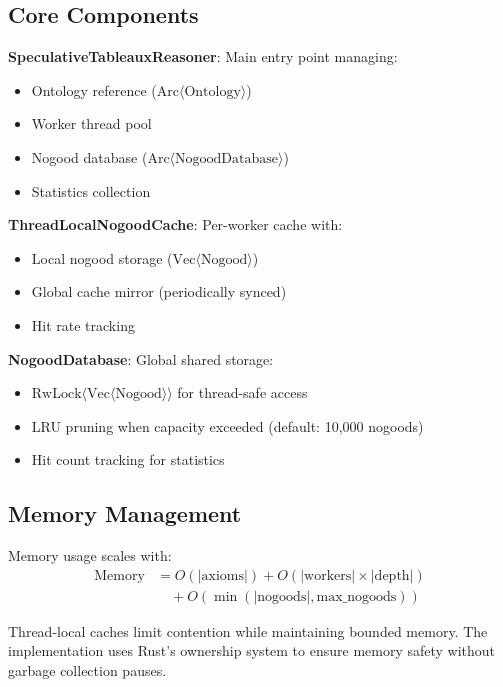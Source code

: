\documentclass[preprint,12pt]{elsarticle}
\begin{document}
\subsection{Core Components}
\label{sec:components}

\textbf{SpeculativeTableauxReasoner}: Main entry point managing:
\begin{itemize}
    \item Ontology reference ($\text{Arc}\langle\text{Ontology}\rangle$)
    \item Worker thread pool
    \item Nogood database ($\text{Arc}\langle\text{NogoodDatabase}\rangle$)
    \item Statistics collection
\end{itemize}

\textbf{ThreadLocalNogoodCache}: Per-worker cache with:
\begin{itemize}
    \item Local nogood storage ($\text{Vec}\langle\text{Nogood}\rangle$)
    \item Global cache mirror (periodically synced)
    \item Hit rate tracking
\end{itemize}

\textbf{NogoodDatabase}: Global shared storage:
\begin{itemize}
    \item $\text{RwLock}\langle\text{Vec}\langle\text{Nogood}\rangle\rangle$ for thread-safe access
    \item LRU pruning when capacity exceeded (default: 10,000 nogoods)
    \item Hit count tracking for statistics
\end{itemize}

\subsection{Memory Management}
\label{sec:memory}

Memory usage scales with:
\begin{align}
\text{Memory} &= O(|\text{axioms}|) + O(|\text{workers}| \times |\text{depth}|) \\
&\quad + O(\min(|\text{nogoods}|, \text{max\_nogoods}))
\end{align}

Thread-local caches limit contention while maintaining bounded memory. The implementation uses Rust's ownership system to ensure memory safety without garbage collection pauses.
\end{document}

